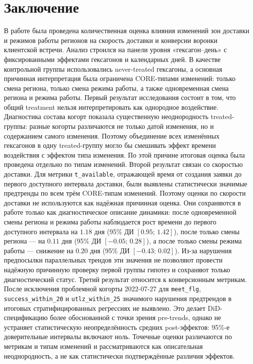 \documentclass[14pt,a4paper]{extarticle}
\begin{document}
\section{Заключение}
В работе была проведена количественная оценка влияния изменений зон доставки и режимов работы регионов на скорость доставки и конверсии воронки клиентской встречи. Анализ строился на панели уровня «гексагон--день» с фиксированными эффектами гексагонов и календарных дней. В качестве контрольной группы использовались never-treated гексагоны, а основная причинная интерпретация была ограничена CORE-типами изменений: только смена региона, только смена режима работы, а также одновременная смена региона и режима работы.
Первый результат исследования состоит в том, что общий treatment нельзя интерпретировать как однородное воздействие. Диагностика состава когорт показала существенную неоднородность treated-группы: разные когорты различаются не только датой изменения, но и содержанием самого изменения. Поэтому объединение всех изменённых гексагонов в одну treated-группу могло бы смешивать эффект времени воздействия с эффектом типа изменения. По этой причине итоговая оценка была проведена отдельно по типам изменений.
Второй результат связан со скоростью доставки. Для метрики \texttt{t\_available}, отражающей время от создания заявки до первого доступного интервала доставки, были выявлены статистически значимые предтренды по всем трём CORE-типам изменений. Поэтому оценки по скорости доставки не используются как надёжная причинная оценка. Они сохраняются в работе только как диагностическое описание динамики: после одновременной смены региона и режима работы наблюдается рост времени до первого доступного интервала на \(1.18\) дня (95\% ДИ \([0.95;\,1.42]\)), после только смены региона --- на \(0.11\) дня (95\% ДИ \([-0.05;\,0.28]\)), а после только смены режима работы --- снижение на \(0.20\) дня (95\% ДИ \([-0.43;\,0.02]\)). Из-за нарушения предпосылки параллельных трендов эти значения не позволяют провести надёжную причинную проверку первой группы гипотез и сохраняют только диагностический статус.
Третий результат относится к конверсионным метрикам. После исключения проблемной когорты 2022-07-27 для \texttt{meet\_flg}, \texttt{success\_within\_20} и \texttt{utlz\_within\_25} значимого нарушения предтрендов в итоговых стратифицированных регрессиях не выявлено. Это делает DiD-спецификацию более обоснованной с точки зрения pre-trends, однако не устраняет статистическую неопределённость средних post-эффектов: 95\%-е доверительные интервалы включают ноль. Точечные оценки различаются по метрикам и типам изменений и рассматриваются как описательная неоднородность, а не как статистически подтверждённые различия эффектов.
\end{document}
